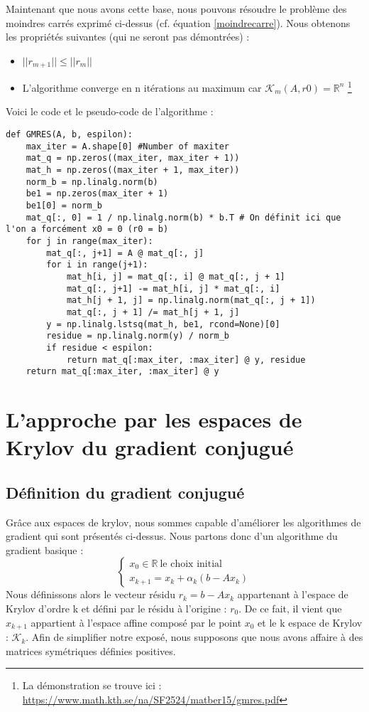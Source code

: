 Maintenant que nous avons cette base, nous pouvons résoudre le problème des moindres carrés exprimé ci-dessus (cf. équation \ref{moindrecarre}). Nous obtenons les propriétés suivantes (qui ne seront pas démontrées)  : 
\begin{itemize}
	\item $||r_{m+1}|| \leq ||r_m||$
	\item L'algorithme converge en n itérations au maximum car $\mathcal{K}_m(A, r0) = \mathbb{R}^n$ \footnote{La démonstration se trouve ici : \url{https://www.math.kth.se/na/SF2524/matber15/gmres.pdf}}
\end{itemize}
Voici le code et le pseudo-code de l'algorithme : 
\begin{verbatim}
def GMRES(A, b, espilon):
	max_iter = A.shape[0] #Number of maxiter
	mat_q = np.zeros((max_iter, max_iter + 1))
	mat_h = np.zeros((max_iter + 1, max_iter))
	norm_b = np.linalg.norm(b)
	be1 = np.zeros(max_iter + 1)
	be1[0] = norm_b
	mat_q[:, 0] = 1 / np.linalg.norm(b) * b.T # On définit ici que l'on a forcément x0 = 0 (r0 = b)
	for j in range(max_iter):
		mat_q[:, j+1] = A @ mat_q[:, j]
		for i in range(j+1):
			mat_h[i, j] = mat_q[:, i] @ mat_q[:, j + 1]
			mat_q[:, j+1] -= mat_h[i, j] * mat_q[:, i]
			mat_h[j + 1, j] = np.linalg.norm(mat_q[:, j + 1])
			mat_q[:, j + 1] /= mat_h[j + 1, j]
		y = np.linalg.lstsq(mat_h, be1, rcond=None)[0]
		residue = np.linalg.norm(y) / norm_b
		if residue < espilon:
			return mat_q[:max_iter, :max_iter] @ y, residue
	return mat_q[:max_iter, :max_iter] @ y
\end{verbatim}

\section{L'approche par les espaces de Krylov du gradient conjugué}
\subsection{Définition du gradient conjugué}
Grâce aux espaces de krylov, nous sommes capable d'améliorer les algorithmes de gradient qui sont présentés ci-dessus. Nous partons donc d'un algorithme du gradient basique : 
\begin{equation}
\begin{cases}
	x_0 \in \mathbb{R} \ \text{le choix initial}\\
	x_{k+1} = x_k + \alpha_k (b - Ax_k)
\end{cases}
\end{equation}
Nous définissons alors le vecteur résidu $r_k = b - Ax_k$ appartenant à l'espace de Krylov d'ordre k et défini par le résidu à l'origine : $r_0$. De ce fait, il vient que $x_{k+1}$ appartient à l'espace affine composé par le point $x_0$ et le k espace de Krylov : $\mathcal{K}_k$. Afin de simplifier notre exposé, nous supposons que nous avons affaire à des matrices symétriques définies positives. \\


